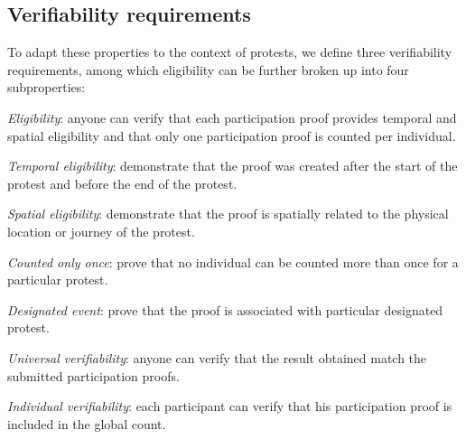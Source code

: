 \subsection{Verifiability requirements}%
\label{verifiability-properties}

To adapt these properties to the context of protests, we define three 
verifiability requirements, among which eligibility can be further broken up 
into four subproperties:
\begin{requirements}[V]
  \item\label{EligibilityVerif} \emph{Eligibility}: anyone can verify that each participation proof provides temporal and spatial eligibility and that only one participation proof is counted per individual.
    \begin{requirements}
    \item\label{TemporallyRelated} \emph{Temporal eligibility}: demonstrate that the proof was created after the start of the protest and before the end of the protest.
    \item\label{SpatiallyRelated} \emph{Spatial eligibility}: demonstrate that the proof is spatially related to the physical location or journey of the protest.
    \item\label{CountOnce} \emph{Counted only once}: prove that no individual 
      can be counted more than once for a particular protest.
    \item\label{DesignatedEvent} \emph{Designated event}: prove that the proof is associated with particular designated protest.
    \end{requirements}

  \item\label{UniversalVerif} \emph{Universal verifiability}: anyone can verify that the result obtained match the submitted participation proofs.

  \item\label{IndividualVerif} \emph{Individual verifiability}: each participant can verify that his participation proof is included in the global count.
\end{requirements}

